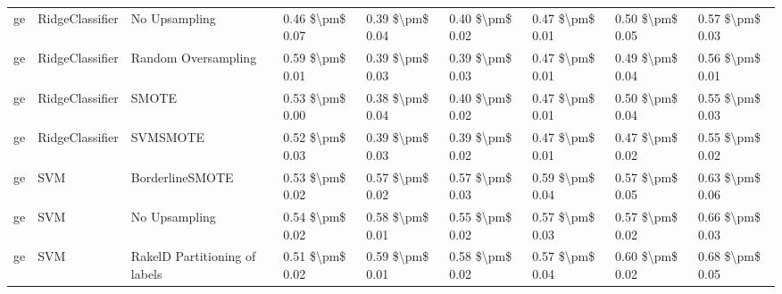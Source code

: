 \begin{tabular}{lllllllll}
      ge &                 RidgeClassifier &                 No Upsampling &     0.46 \$\textbackslash pm\$ 0.07 &           0.39 \$\textbackslash pm\$ 0.04 &       0.40 \$\textbackslash pm\$ 0.02 &        0.47 \$\textbackslash pm\$ 0.01 &                         0.50 \$\textbackslash pm\$ 0.05 &     0.57 \$\textbackslash pm\$ 0.03 \\
      ge &                 RidgeClassifier &           Random Oversampling &     0.59 \$\textbackslash pm\$ 0.01 &           0.39 \$\textbackslash pm\$ 0.03 &       0.39 \$\textbackslash pm\$ 0.03 &        0.47 \$\textbackslash pm\$ 0.01 &                         0.49 \$\textbackslash pm\$ 0.04 &     0.56 \$\textbackslash pm\$ 0.01 \\
      ge &                 RidgeClassifier &                         SMOTE &     0.53 \$\textbackslash pm\$ 0.00 &           0.38 \$\textbackslash pm\$ 0.04 &       0.40 \$\textbackslash pm\$ 0.02 &        0.47 \$\textbackslash pm\$ 0.01 &                         0.50 \$\textbackslash pm\$ 0.04 &     0.55 \$\textbackslash pm\$ 0.03 \\
      ge &                 RidgeClassifier &                      SVMSMOTE &     0.52 \$\textbackslash pm\$ 0.03 &           0.39 \$\textbackslash pm\$ 0.03 &       0.39 \$\textbackslash pm\$ 0.02 &        0.47 \$\textbackslash pm\$ 0.01 &                         0.47 \$\textbackslash pm\$ 0.02 &     0.55 \$\textbackslash pm\$ 0.02 \\
      ge &                             SVM &               BorderlineSMOTE &     0.53 \$\textbackslash pm\$ 0.02 &           0.57 \$\textbackslash pm\$ 0.02 &       0.57 \$\textbackslash pm\$ 0.03 &        0.59 \$\textbackslash pm\$ 0.04 &                         0.57 \$\textbackslash pm\$ 0.05 &     0.63 \$\textbackslash pm\$ 0.06 \\
      ge &                             SVM &                 No Upsampling &     0.54 \$\textbackslash pm\$ 0.02 &           0.58 \$\textbackslash pm\$ 0.01 &       0.55 \$\textbackslash pm\$ 0.02 &        0.57 \$\textbackslash pm\$ 0.03 &                         0.57 \$\textbackslash pm\$ 0.02 &     0.66 \$\textbackslash pm\$ 0.03 \\
      ge &                             SVM & RakelD Partitioning of labels &     0.51 \$\textbackslash pm\$ 0.02 &           0.59 \$\textbackslash pm\$ 0.01 &       0.58 \$\textbackslash pm\$ 0.02 &        0.57 \$\textbackslash pm\$ 0.04 &                         0.60 \$\textbackslash pm\$ 0.02 &     0.68 \$\textbackslash pm\$ 0.05 \\

\end{tabular}
